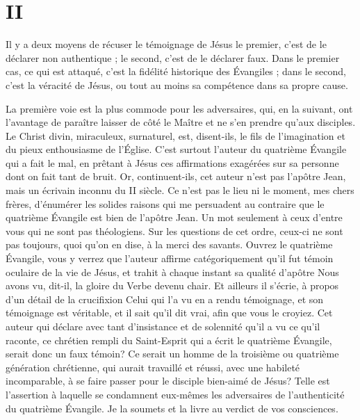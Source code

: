 \section{II}

Il y a deux moyens de récuser le témoignage de Jésus\frcolon{} le premier, c’est de le déclarer non authentique ; le second, c’est de le déclarer faux. Dans le premier cas, ce qui est attaqué, c’est la fidélité historique des Évangiles ; dans le second, c’est la véracité de Jésus, ou tout au moins sa compétence dans sa propre cause.

La première voie est la plus commode pour les adversaires, qui, en la suivant, ont l’avantage de paraître laisser de côté le Maître et ne s’en prendre qu’aux disciples. Le Christ divin, miraculeux, surnaturel, est, disent-ils, le fils de l’imagination et du pieux enthousiasme de l’Église. C’est surtout l’auteur du quatrième Évangile qui a fait le mal, en prêtant à Jésus ces affirmations exagérées sur sa personne dont on fait tant de bruit. Or, continuent-ils, cet auteur n’est pas l’apôtre Jean, mais un écrivain inconnu du II siècle. \ocadr{} Ce n’est pas le lieu ni le moment, mes chers frères, d’énumérer les solides raisons qui me persuadent au contraire que le quatrième Évangile est bien de l’apôtre Jean. Un mot seulement à ceux d’entre vous qui ne sont pas théologiens. Sur les questions de cet ordre, ceux-ci ne sont pas toujours, quoi qu’on en dise, à la merci des savants. Ouvrez le quatrième Évangile, vous y verrez que l’auteur affirme catégoriquement qu’il fut témoin oculaire de la vie de Jésus, et trahit à chaque instant sa qualité d’apôtre\frcolon{}
\Og{} Nous avons vu, dit-il, la gloire du Verbe devenu chair.\Fg{}
Et ailleurs il s’écrie, à propos d’un détail de la crucifixion\frcolon{}
\Og{} Celui qui l’a vu en a rendu témoignage, et son témoignage est véritable, et il sait qu’il dit vrai, afin que vous le croyiez.\Fg{}
Cet auteur qui déclare avec tant d’insistance et de solennité qu’il a vu ce qu’il raconte, ce chrétien rempli du Saint-Esprit qui a écrit le quatrième Évangile, serait donc un faux témoin?
Ce serait un homme de la troisième ou quatrième génération chrétienne, qui aurait travaillé et réussi, avec une habileté incomparable,
à se faire passer pour le disciple bien-aimé de Jésus? \ocadr{} Telle est l’assertion à laquelle se condamnent eux-mêmes les adversaires
de l’authenticité du quatrième Évangile.
Je la soumets et la livre au verdict de vos consciences.

